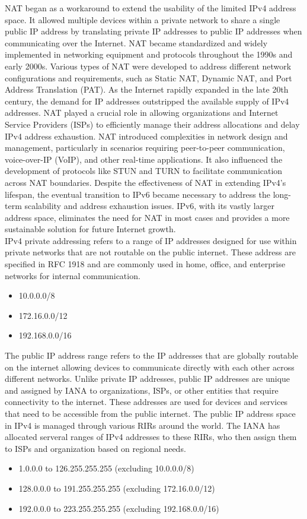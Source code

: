 \documentclass{article}
\begin{document}
		NAT began as a workaround to extend the usability of the limited IPv4 address space. It allowed multiple devices within a private network to share a single public IP address by translating private IP addresses to public IP addresses when communicating over the Internet. NAT became standardized and widely implemented in networking equipment and protocols throughout the 1990s and early 2000s. Various types of NAT were developed to address different network configurations and requirements, such as Static NAT, Dynamic NAT, and Port Address Translation (PAT). As the Internet rapidly expanded in the late 20th century, the demand for IP addresses outstripped the available supply of IPv4 addresses. NAT played a crucial role in allowing organizations and Internet Service Providers (ISPs) to efficiently manage their address allocations and delay IPv4 address exhaustion. NAT introduced complexities in network design and management, particularly in scenarios requiring peer-to-peer communication, voice-over-IP (VoIP), and other real-time applications. It also influenced the development of protocols like STUN and TURN to facilitate communication across NAT boundaries. Despite the effectiveness of NAT in extending IPv4's lifespan, the eventual transition to IPv6 became necessary to address the long-term scalability and address exhaustion issues. IPv6, with its vastly larger address space, eliminates the need for NAT in most cases and provides a more sustainable solution for future Internet growth.\\

	IPv4 private addressing refers to a range of IP addresses designed for use within private networks that are not routable on the public internet. These address are specified in RFC 1918 and are commonly used in home, office, and enterprise networks for internal communication. 
\begin{itemize}
\item10.0.0.0/8
\item172.16.0.0/12
\item192.168.0.0/16
\end{itemize}
	
	The public IP address range refers to the IP addresses that are globally routable on the internet allowing devices to communicate directly with each other across different networks. Unlike private IP addresses, public IP addresses are unique and assigned by IANA to organizations, ISPs, or other entities that require connectivity to the internet. These addresses are used for devices and services that need to be accessible from the public internet. The public IP address space in IPv4 is managed through various RIRs around the world. The IANA has allocated serveral ranges of IPv4 addresses to these RIRs, who then assign them to ISPs and organization based on regional needs.
\begin{itemize}
\item1.0.0.0 to 126.255.255.255 (excluding 10.0.0.0/8)
\item128.0.0.0 to 191.255.255.255 (excluding 172.16.0.0/12)
\item192.0.0.0 to 223.255.255.255 (excluding 192.168.0.0/16)
\end{itemize}
	
\end{document}
